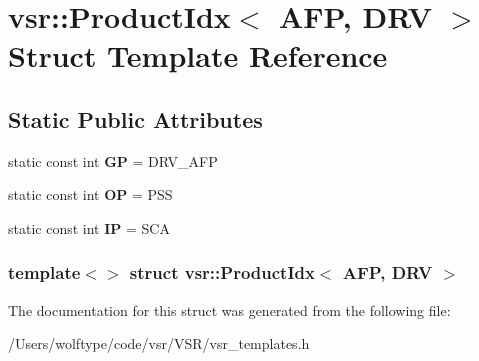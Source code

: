 \hypertarget{structvsr_1_1_product_idx_3_01_a_f_p_00_01_d_r_v_01_4}{\section{vsr\-:\-:Product\-Idx$<$ A\-F\-P, D\-R\-V $>$ Struct Template Reference}
\label{structvsr_1_1_product_idx_3_01_a_f_p_00_01_d_r_v_01_4}
}
\subsection*{Static Public Attributes}
\begin{DoxyCompactItemize}
\item 
\hypertarget{structvsr_1_1_product_idx_3_01_a_f_p_00_01_d_r_v_01_4_a746e775c4f0f52ca4314d753230d8b31}{static const int {\bfseries G\-P} = D\-R\-V\-\_\-\-A\-F\-P}\label{structvsr_1_1_product_idx_3_01_a_f_p_00_01_d_r_v_01_4_a746e775c4f0f52ca4314d753230d8b31}

\item 
\hypertarget{structvsr_1_1_product_idx_3_01_a_f_p_00_01_d_r_v_01_4_a91e33d9be034da8cb2562c16e0d2ed87}{static const int {\bfseries O\-P} = P\-S\-S}\label{structvsr_1_1_product_idx_3_01_a_f_p_00_01_d_r_v_01_4_a91e33d9be034da8cb2562c16e0d2ed87}

\item 
\hypertarget{structvsr_1_1_product_idx_3_01_a_f_p_00_01_d_r_v_01_4_a4aa8eea88da889667c7a78896e5efa64}{static const int {\bfseries I\-P} = S\-C\-A}\label{structvsr_1_1_product_idx_3_01_a_f_p_00_01_d_r_v_01_4_a4aa8eea88da889667c7a78896e5efa64}

\end{DoxyCompactItemize}
\subsubsection*{template$<$$>$ struct vsr\-::\-Product\-Idx$<$ A\-F\-P, D\-R\-V $>$}



The documentation for this struct was generated from the following file\-:\begin{DoxyCompactItemize}
\item 
/\-Users/wolftype/code/vsr/\-V\-S\-R/vsr\-\_\-templates.\-h\end{DoxyCompactItemize}
